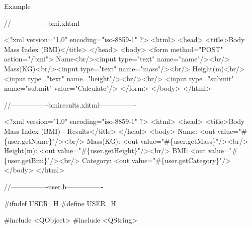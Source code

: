 \begin{DoxyParagraph}{Example}

\begin{DoxyCode}
\textcolor{comment}{//----------------bmi.xhtml----------------}

<?xml version=\textcolor{stringliteral}{"1.0"} encoding=\textcolor{stringliteral}{"iso-8859-1"} ?>
<html>
     <head>
         <title>Body Mass Index (BMI)</title>
     </head>
     <body>
         <form method=\textcolor{stringliteral}{"POST"} action=\textcolor{stringliteral}{"/bmi"}>
             Name<br/><input type=\textcolor{stringliteral}{"text"} name=\textcolor{stringliteral}{"name"}/><br/>
             Mass(KG)<br/><input type=\textcolor{stringliteral}{"text"} name=\textcolor{stringliteral}{"mass"}/><br/>
             Height(m)<br/><input type=\textcolor{stringliteral}{"text"} name=\textcolor{stringliteral}{"height"}/><br/><br/>
             <input type=\textcolor{stringliteral}{"submit"} name=\textcolor{stringliteral}{"submit"} value=\textcolor{stringliteral}{"Calculate"}/>
         </form>
     </body>
 </html>

\textcolor{comment}{//----------------bmiresults.xhtml----------------}

<?xml version=\textcolor{stringliteral}{"1.0"} encoding=\textcolor{stringliteral}{"iso-8859-1"} ?>
<html>
     <head>
         <title>Body Mass Index (BMI) - Results</title>
     </head>
     <body>
         Name: <out value=\textcolor{stringliteral}{"#\{user.getName\}"}/><br/>
         Mass(KG): <out value=\textcolor{stringliteral}{"#\{user.getMass\}"}/><br/>
         Height(m): <out value=\textcolor{stringliteral}{"#\{user.getHeight\}"}/><br/>
         BMI: <out value=\textcolor{stringliteral}{"#\{user.getBmi\}"}/><br/>
         Category: <out value=\textcolor{stringliteral}{"#\{user.getCategory\}"}/>
     </body>
</html>

\textcolor{comment}{//----------------user.h----------------}

#ifndef USER\_H
#define USER\_H

#include <QObject>
#include <QString>


\end{DoxyCode}
\end{DoxyParagraph}
